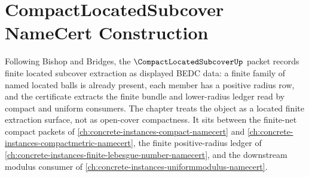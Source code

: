 \chapter{CompactLocatedSubcover NameCert Construction}
\label{ch:concrete-instances-compact-located-subcover-namecert}

Following Bishop and Bridges, the $\CompactLocatedSubcoverUp$ packet records finite located subcover extraction as displayed BEDC data: a finite family of named located balls is already present, each member has a positive radius row, and the certificate extracts the finite bundle and lower-radius ledger read by compact and uniform consumers. The chapter treats the object as a located finite extraction surface, not as open-cover compactness. It sits between the finite-net compact packets of \autoref{ch:concrete-instances-compact-namecert} and \autoref{ch:concrete-instances-compactmetric-namecert}, the finite positive-radius ledger of \autoref{ch:concrete-instances-finite-lebesgue-number-namecert}, and the downstream modulus consumer of \autoref{ch:concrete-instances-uniformmodulus-namecert}.

